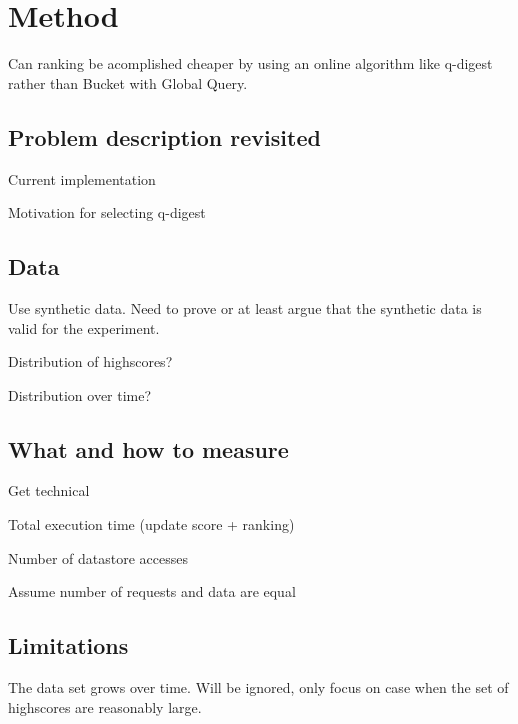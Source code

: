 \chapter{Method}

Can ranking be acomplished cheaper by using an online algorithm like q-digest
rather than Bucket with Global Query.

\section{Problem description revisited}

\begin{shaded}

Current implementation

Motivation for selecting q-digest

\end{shaded}

\section{Data}

Use synthetic data. Need to prove or at least argue that the synthetic data is valid for the experiment.

\begin{shaded}

  Distribution of highscores?

  Distribution over time?
 
\end{shaded}

\section{What and how to measure}

Get technical

Total execution time (update score + ranking)

Number of datastore accesses

Assume number of requests and data are equal

\section{Limitations}

The data set grows over time. Will be ignored, only focus on case when the set of highscores are reasonably large.